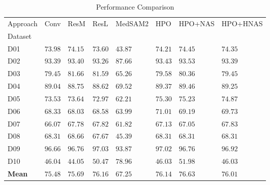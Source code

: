 \begin{table}
\caption{Performance Comparison}
\label{tab:results}
\begin{tabular}{llllllll}
\toprule
Approach & Conv & ResM & ResL & MedSAM2 & HPO & HPO+NAS & HPO+HNAS \\
Dataset &  &  &  &  &  &  &  \\
\midrule
D01 & $73.98$ & $74.15$ & $73.60$ & $43.87$ & $74.21$ & $\mathbf{74.45}$ & $74.35$ \\
D02 & $93.39$ & $93.40$ & $93.26$ & $87.66$ & $93.43$ & $\mathbf{93.53}$ & $93.39$ \\
D03 & $79.45$ & $\mathbf{81.66}$ & $81.59$ & $65.26$ & $79.58$ & $80.36$ & $79.45$ \\
D04 & $89.04$ & $88.75$ & $88.62$ & $69.52$ & $89.37$ & $\mathbf{89.46}$ & $89.25$ \\
D05 & $73.53$ & $73.64$ & $72.97$ & $62.21$ & $\mathbf{75.30}$ & $75.23$ & $74.87$ \\
D06 & $68.33$ & $68.03$ & $68.58$ & $63.99$ & $\mathbf{71.01}$ & $69.19$ & $69.73$ \\
D07 & $66.07$ & $67.78$ & $67.82$ & $61.82$ & $67.13$ & $67.05$ & $\mathbf{67.83}$ \\
D08 & $68.31$ & $\mathbf{68.66}$ & $67.67$ & $45.39$ & $68.31$ & $68.31$ & $68.31$ \\
D09 & $96.66$ & $96.76$ & $\mathbf{97.03}$ & $93.87$ & $97.02$ & $96.76$ & $96.92$ \\
D10 & $46.04$ & $44.05$ & $50.47$ & $\mathbf{78.96}$ & $46.03$ & $51.98$ & $46.03$ \\
\textbf{Mean} & $75.48$ & $75.69$ & $76.16$ & $67.25$ & $76.14$ & $\mathbf{76.63}$ & $76.01$ \\
\bottomrule
\end{tabular}
\end{table}

